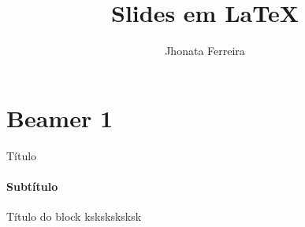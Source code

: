 \documentclass{beamer}
\title{Slides em \LaTeX}
\author{Jhonata Ferreira}
\institute{IFRN}
\begin{document}
\maketitle

\section{Beamer 1}
\begin{frame}{Título}
    \framesubtitle{Subtítulo}
    \lipsum[1]
    \begin{block}{Título do block}
        ksksksksksk
    \end{block}
\end{frame}
\end{document}
